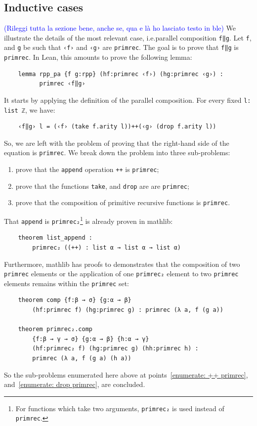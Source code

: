 \documentclass[preprint]{elsarticle}
\theoremstyle{remark}
\newcommand{\MATHLIB}{\textsf{mathlib}\xspace}
\newcommand{\LEAN}{\textsf{Lean}\xspace}
\begin{document}
\subsection{Inductive cases}
\textcolor{blue}{(Rileggi tutta la sezione bene, anche se, qua e là ho lasciato testo in ble)}
We illustrate the details of the most relevant case, i.e.\@ parallel composition \lstinline|f‖g|. Let \lstinline|f|, and \lstinline|g| be such that \lstinline|‹f›| and \lstinline|‹g›| are \lstinline|primrec|. The goal is to prove that \lstinline|f‖g| is \lstinline|primrec|. In \LEAN, this amounts to prove the following lemma:
\begin{lstlisting}
    lemma rpp_pa {f g:rpp} (hf:primrec ‹f›) (hg:primrec ‹g›) :
          primrec ‹f‖g›
\end{lstlisting}
\noindent
It starts by applying the definition of the parallel composition. For every fixed \lstinline|l: list ℤ|, we have:
\begin{lstlisting}
    ‹f‖g› l = (‹f› (take f.arity l))++(‹g› (drop f.arity l))
\end{lstlisting}
\noindent
So, we are left with the problem of proving that the right-hand side of the equation is \lstinline|primrec|. We break down the problem into three sub-problems:
\begin{enumerate}
    \item \label{enumerate: ++ primrec}
    prove that the \lstinline|append| operation \lstinline|++| is \lstinline|primrec|;
    \item \label{enumerate: drop primrec}
    prove that the functions \lstinline|take|, and \lstinline|drop| are are \lstinline|primrec|;
    \item \label{enumerate: comp primrec}
    prove that the composition of primitive recursive functions is \lstinline|primrec|.
\end{enumerate}
\noindent
That \lstinline|append| is \lstinline|primrec₂|\footnote{For functions which take two arguments, \lstinline|primrec₂| is used instead of \lstinline|primrec|.} is already proven in \MATHLIB:
\begin{lstlisting}
    theorem list_append :
        primrec₂ ((++) : list α → list α → list α)
\end{lstlisting}
\noindent
Furthermore, \MATHLIB has proofs to demonstrates that the composition of two \lstinline|primrec| elements or the application of one \lstinline|primrec₂| element to two \lstinline|primrec| elements remains within the \lstinline|primrec| set:
\begin{lstlisting}
    theorem comp {f:β → σ} {g:α → β}
        (hf:primrec f) (hg:primrec g) : primrec (λ a, f (g a))

    theorem primrec₂.comp
        {f:β → γ → σ} {g:α → β} {h:α → γ}
        (hf:primrec₂ f) (hg:primrec g) (hh:primrec h) :
        primrec (λ a, f (g a) (h a))
\end{lstlisting}
\noindent
So the sub-problems enumerated here above at points~\ref{enumerate: ++ primrec}, and~\ref{enumerate: drop primrec}, are concluded.
\end{document}
